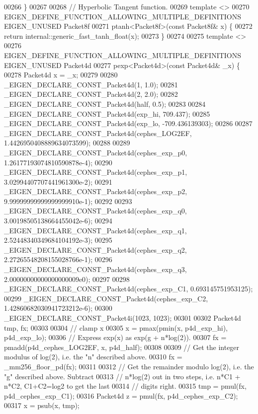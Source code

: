 \begin{DoxyCode}
00266 \}
00267 
00268 \textcolor{comment}{// Hyperbolic Tangent function.}
00269 \textcolor{keyword}{template} <>
00270 EIGEN\_DEFINE\_FUNCTION\_ALLOWING\_MULTIPLE\_DEFINITIONS EIGEN\_UNUSED Packet8f
00271 ptanh<Packet8f>(\textcolor{keyword}{const} Packet8f& x) \{
00272   \textcolor{keywordflow}{return} internal::generic\_fast\_tanh\_float(x);
00273 \}
00274 
00275 \textcolor{keyword}{template} <>
00276 EIGEN\_DEFINE\_FUNCTION\_ALLOWING\_MULTIPLE\_DEFINITIONS EIGEN\_UNUSED Packet4d
00277 pexp<Packet4d>(\textcolor{keyword}{const} Packet4d& \_x) \{
00278   Packet4d x = \_x;
00279 
00280   \_EIGEN\_DECLARE\_CONST\_Packet4d(1, 1.0);
00281   \_EIGEN\_DECLARE\_CONST\_Packet4d(2, 2.0);
00282   \_EIGEN\_DECLARE\_CONST\_Packet4d(half, 0.5);
00283 
00284   \_EIGEN\_DECLARE\_CONST\_Packet4d(exp\_hi, 709.437);
00285   \_EIGEN\_DECLARE\_CONST\_Packet4d(exp\_lo, -709.436139303);
00286 
00287   \_EIGEN\_DECLARE\_CONST\_Packet4d(cephes\_LOG2EF, 1.4426950408889634073599);
00288 
00289   \_EIGEN\_DECLARE\_CONST\_Packet4d(cephes\_exp\_p0, 1.26177193074810590878e-4);
00290   \_EIGEN\_DECLARE\_CONST\_Packet4d(cephes\_exp\_p1, 3.02994407707441961300e-2);
00291   \_EIGEN\_DECLARE\_CONST\_Packet4d(cephes\_exp\_p2, 9.99999999999999999910e-1);
00292 
00293   \_EIGEN\_DECLARE\_CONST\_Packet4d(cephes\_exp\_q0, 3.00198505138664455042e-6);
00294   \_EIGEN\_DECLARE\_CONST\_Packet4d(cephes\_exp\_q1, 2.52448340349684104192e-3);
00295   \_EIGEN\_DECLARE\_CONST\_Packet4d(cephes\_exp\_q2, 2.27265548208155028766e-1);
00296   \_EIGEN\_DECLARE\_CONST\_Packet4d(cephes\_exp\_q3, 2.00000000000000000009e0);
00297 
00298   \_EIGEN\_DECLARE\_CONST\_Packet4d(cephes\_exp\_C1, 0.693145751953125);
00299   \_EIGEN\_DECLARE\_CONST\_Packet4d(cephes\_exp\_C2, 1.42860682030941723212e-6);
00300   \_EIGEN\_DECLARE\_CONST\_Packet4i(1023, 1023);
00301 
00302   Packet4d tmp, fx;
00303 
00304   \textcolor{comment}{// clamp x}
00305   x = pmax(pmin(x, p4d\_exp\_hi), p4d\_exp\_lo);
00306   \textcolor{comment}{// Express exp(x) as exp(g + n*log(2)).}
00307   fx = pmadd(p4d\_cephes\_LOG2EF, x, p4d\_half);
00308 
00309   \textcolor{comment}{// Get the integer modulus of log(2), i.e. the "n" described above.}
00310   fx = \_mm256\_floor\_pd(fx);
00311 
00312   \textcolor{comment}{// Get the remainder modulo log(2), i.e. the "g" described above. Subtract}
00313   \textcolor{comment}{// n*log(2) out in two steps, i.e. n*C1 + n*C2, C1+C2=log2 to get the last}
00314   \textcolor{comment}{// digits right.}
00315   tmp = pmul(fx, p4d\_cephes\_exp\_C1);
00316   Packet4d z = pmul(fx, p4d\_cephes\_exp\_C2);
00317   x = psub(x, tmp);

\end{DoxyCode}
